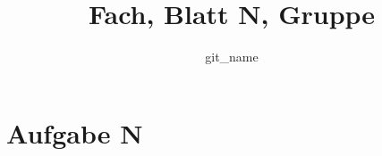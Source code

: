 \documentclass[12pt,pdftex,a4paper]{article}
\begin{document}
\title{\textbf{Fach, Blatt N, Gruppe} }
\author{{{ git_name }}}

\maketitle
\renewcommand{\labelenumi}{\alph{enumi})}

\section*{Aufgabe N}
\begin{enumerate}
\end{enumerate}
\end{document}
